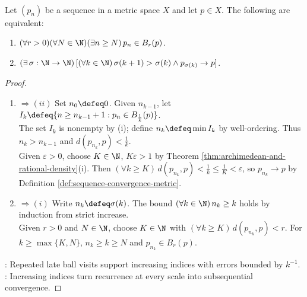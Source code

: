 \begin{proposition} \label{prop:sequence-limit-points-subsequential-limits} \\
Let $(p_n)$ be a sequence in a metric space $X$ and let $p\in X$. The following are equivalent:
\begin{enumerate}[label=(\roman*)]
\setlength{\itemsep}{0pt}
\item $(\forall r>0)(\forall N\in\N)(\exists n\geq N)\,p_n\in B_r(p)$.
\item $(\exists\,\sigma:\N\to\N)\,[(\forall k\in\N)\,\sigma(k+1)>\sigma(k)\land p_{\sigma(k)}\to p]$.
\end{enumerate}
\begin{proof}
\begin{enumerate}[label=(\roman*)]
\setlength{\itemsep}{0pt}
\item[$(i)$] $\Rightarrow (ii)$ Set $n_0\defeq0$. Given $n_{k-1}$, let $I_k\defeq\{n\geq n_{k-1}+1:p_n\in B_{\frac{1}{k}}(p)\}$.\\
The set $I_k$ is nonempty by (i); define $n_k\defeq\min I_k$ by well-ordering. Thus $n_k>n_{k-1}$ and $d(p_{n_k},p)<\frac{1}{k}$.\\
Given $\varepsilon>0$, choose $K\in\N$, $K\varepsilon>1$ by Theorem \ref{thm:archimedean-and-rational-density}(i). Then $(\forall k\geq K)\,d(p_{n_k},p)<\frac{1}{k}\leq\frac{1}{K}<\varepsilon$, so $p_{n_k}\to p$ by Definition \ref{def:sequence-convergence-metric}.
\item[$(ii)$] $\Rightarrow (i)$ Write $n_k\defeq\sigma(k)$. The bound $(\forall k\in\N)\,n_k\geq k$ holds by induction from strict increase.\\
Given $r>0$ and $N\in\N$, choose $K\in\N$ with $(\forall k\geq K)\,d(p_{n_k},p)<r$. For $k\geq\max\{K,N\}$, $n_k\geq k\geq N$ and $p_{n_k}\in B_r(p)$.
\end{enumerate}
: Repeated late ball visits support increasing indices with errors bounded by $k^{-1}$.\\
: Increasing indices turn recurrence at every scale into subsequential convergence.
\end{proof}
\end{proposition}

